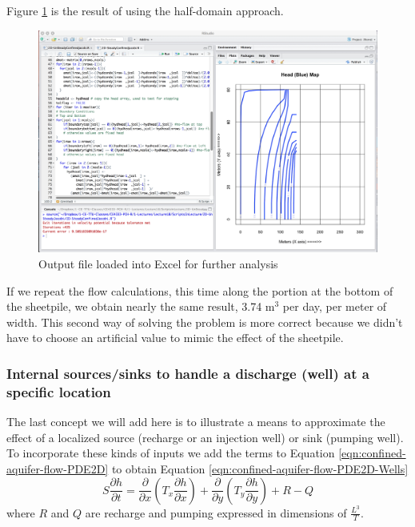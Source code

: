 Figure \ref{fig:DamSeepageHalfInR} is the result of using the half-domain approach.
\begin{figure}[h!] %
   \centering
   \includegraphics[width=6in]{./17-SteadyGroundwaterFlow/DamSeepageHalfInR.jpg} 
   \caption{Output file loaded into Excel for further analysis}
   \label{fig:DamSeepageHalfInR}
\end{figure}

If we repeat the flow calculations, this time along the portion at the bottom of the sheetpile, we obtain nearly the same result, 3.74 m$^3$ per day, per meter of width.  
This second way of solving the problem is more correct because we didn't have to choose an artificial value to mimic the effect of the sheetpile.

\subsubsection{Internal sources/sinks to handle a discharge (well) at a specific location}
The last concept we will add here is to illustrate a means to approximate the effect of a localized source (recharge or an injection well) or sink (pumping well).  
To incorporate these kinds of inputs we add the terms to Equation \ref{eqn:confined-aquifer-flow-PDE2D} to obtain Equation \ref{eqn:confined-aquifer-flow-PDE2D-Wells}
\begin{equation}
S \frac{\partial h}{\partial t} = 
\frac{\partial}{\partial x}({T_x \frac{\partial h}{\partial x}})
+
\frac{\partial}{\partial y}({T_y \frac{\partial h}{\partial y}})
+ R - Q
\label{eqn:confined-aquifer-flow-PDE2D-Wells}
\end{equation}
where $R$ and $Q$ are recharge and pumping expressed in dimensions of $\frac{L^3}{T}$.

